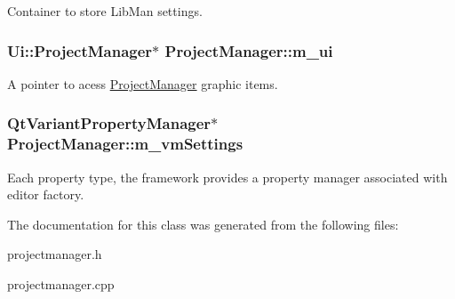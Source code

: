 Container to store Lib\-Man settings. \hypertarget{classProjectManager_a522b0621f0ca1978d0cef23fc553fd5e}{
\subsubsection[{m\-\_\-ui}]{\setlength{\rightskip}{0pt plus 5cm}Ui\-::\-Project\-Manager$\ast$ Project\-Manager\-::m\-\_\-ui\hspace{0.3cm}{\ttfamily [private]}}}\label{classProjectManager_a522b0621f0ca1978d0cef23fc553fd5e}
A pointer to acess \hyperlink{classProjectManager}{Project\-Manager} graphic items. \hypertarget{classProjectManager_a713a455e7c92cc5875d590c6d4bb0bf0}{
\subsubsection[{m\-\_\-vm\-Settings}]{\setlength{\rightskip}{0pt plus 5cm}Qt\-Variant\-Property\-Manager$\ast$ Project\-Manager\-::m\-\_\-vm\-Settings\hspace{0.3cm}{\ttfamily [private]}}}\label{classProjectManager_a713a455e7c92cc5875d590c6d4bb0bf0}
Each property type, the framework provides a property manager associated with editor factory. 

The documentation for this class was generated from the following files\-:\begin{DoxyCompactItemize}
\item 
projectmanager.\-h\item 
projectmanager.\-cpp\end{DoxyCompactItemize}

